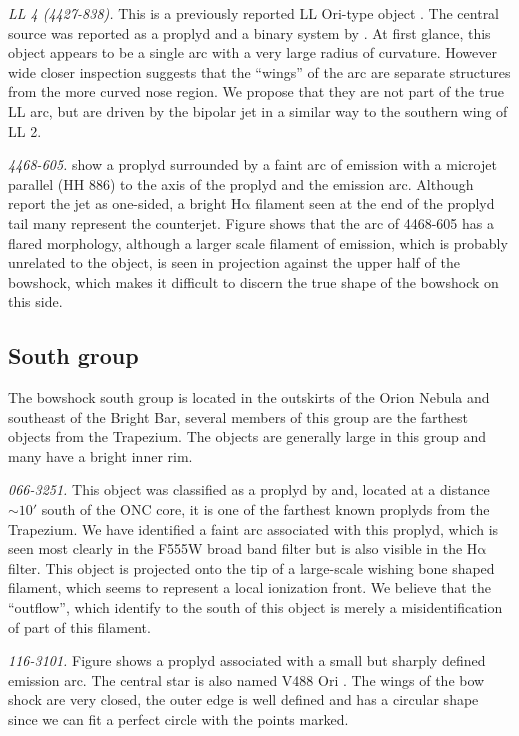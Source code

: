 \documentclass[iop, apj]{emulateapj}
\newcommand\ha{\ensuremath{\mathrm{H\alpha}}}
\begin{document}
\textit{LL 4 (4427-838).} This is a previously reported LL Ori-type object \citep{Bally:2001a}. The central source was reported as a proplyd and a binary system by \citet{Bally:2006a}. At first glance, this object appears to be a single arc with a very large radius of curvature. However wide closer inspection suggests that the ``wings'' of the arc are separate structures from the more curved nose region. We propose that they are not part of the true LL arc, but are driven by the bipolar jet \citep{Bally:2006a} in a similar way to the southern wing of LL 2.     

\textit{4468-605.}  \citet{Bally:2006a} show a proplyd  surrounded by a faint arc of emission with a  microjet parallel (HH 886) to the axis of the proplyd and the emission arc. Although \citet{Bally:2006a} report the jet as one-sided, a bright \ha{} filament seen at the end of the proplyd tail many represent the counterjet.  Figure shows that the arc of 4468-605 has a flared morphology, although a larger scale filament of emission, which is probably unrelated to the object, is seen in projection against the upper half of the bowshock, which makes it difficult to discern the true shape of the bowshock on this side. 

\clearpage
\subsection{South group}
\label{sec:s-group}



The bowshock south group is located in the outskirts of the Orion Nebula and southeast of the Bright Bar, several members of this group are the farthest objects from the Trapezium. The objects are generally large in this group and many have a bright inner rim.   

\textit{066-3251.} This object was classified as a proplyd by \citet{Ricci:2008a} and, located at a distance \(\sim 10'\) south of the ONC core, it is one of the farthest known proplyds from the Trapezium. We have identified a faint arc associated with this proplyd, which is seen most clearly in the F555W broad band filter but is also visible in the \ha{} filter. This object is projected onto the tip of a large-scale wishing bone shaped filament, which seems to represent a local ionization front. We believe that the ``outflow'', which \citet{Ricci:2008a} identify to the south of this object is merely a misidentification of part of this filament.  

\textit{116-3101.} Figure shows a proplyd associated with a small but sharply defined emission arc.  The central star is also named V488 Ori \citep{Bally:2006a}. The wings of the bow shock are very closed, the outer edge is well defined and has a circular shape since we can fit a perfect circle with the points marked.  
\end{document}
